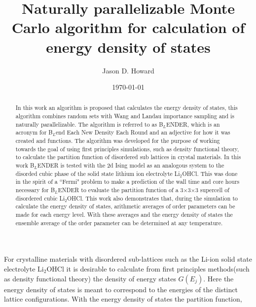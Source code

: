 \documentclass[aps,prl,reprint,superscriptaddress,showkeys]{revtex4-1}
\begin{document}
\title{ Naturally   parallelizable  Monte Carlo  algorithm for calculation of energy density of states}

\author{Jason D. Howard}

\date{\today}

%


\begin{acknowledgments}
\end{acknowledgments}
\begin{abstract}
In this work  an algorithm  is proposed that calculates the energy density of states, this algorithm combines random sets with Wang and Landau importance sampling  and is naturally parallelizable. The algorithm is referred to as B$_L$ENDER, which is an acronym for B$_L$end Each New Density Each Round and an  adjective for  how it was created and functions. The algorithm was developed for the purpose of working towards the goal of using first principles simulations, such as density functional theory, to calculate the partition function of disordered sub lattices in crystal materials. In this work  B$_L$ENDER  is tested with the 2d Ising model as an analogous system to the disorded cubic phase of the solid state lithium ion electrolyte Li$_2$OHCl. This was done in the spirit of a ``Fermi" problem to make a prediction of the  wall time and core hours necessary for B$_L$ENDER to evaluate the partition function of a 3$\times$3$\times$3 supercell of disordered cubic Li$_2$OHCl. This work also demonstrates that, during the simulation to calculate the energy density of states, arithmetic averages of  order parameters can be made for each energy level. With these averages and the energy density of states the ensemble average of the order parameter can be determined at any temperature. 
\end{abstract}
\maketitle
For crystalline  materials  with disordered sub-lattices such as the Li-ion solid state electrolyte  Li$_2$OHCl\cite{Hood, Goodenough, Schwering, Holzwarth_group, Song_Borodin} it is desirable to calculate from first principles methods(such as density functional theory\cite{kohn:1965}) the density of energy states $G(E_j)$. Here the energy density of states is meant to correspond to the energies of the distinct lattice configurations. With the energy density of states the partition function,
\end{document}
